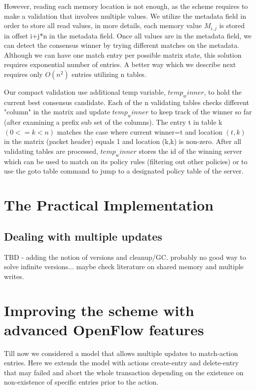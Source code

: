 \documentclass[conference]{sigcomm-alternate}
\begin{document}
However, reading each memory location is not enough, as the scheme requires to make a validation that involves multiple values. We utilize the metadata field in order to store all read values, in more details, each memory value $M_{i,j}$ is stored in offset i+j*n in the metadata field. Once all values are in the metadata field, we can detect the consensus winner by trying different matches on the metadata. Although we can have one match entry per possible matrix state, this solution requires exponential number of entries. A better way which we describe next requires only $O(n^2)$ entries utilizing n tables.

Our compact validation use additional temp variable, $temp_winner$, to hold the current best consensus candidate. Each of the n validating tables checks different "column" in the matrix and update $temp_winner$ to keep track of the winner so far (after examining a prefix sub set of the columns). The entry t in table k $(0<=k<n)$  matches the case where current winner=t and location $(t,k)$ in the matrix (packet header) equals 1 and location (k,k) is non-zero. After all validating tables are processed, $temp_winner$ stores the id of the winning server which can be used to match on its policy rules (filtering out other policies) or to use the goto table command to jump to a designated policy table of the server.


\section{The Practical Implementation}\label{sec:extension}

\subsection{Dealing with multiple updates}

TBD - adding the notion of versions and cleanup/GC. probably no good way to solve infinite versions... maybe check literature on shared memory and multiple writes.


\section{Improving the scheme with advanced OpenFlow features}\label{sec:todo}
Till now we considered a model that allows multiple updates to match-action entries. Here we extends the model with actions create-entry and delete-entry that may failed and abort the whole transaction depending on the existence on non-existence of specific entries prior to the action.
\end{document}
